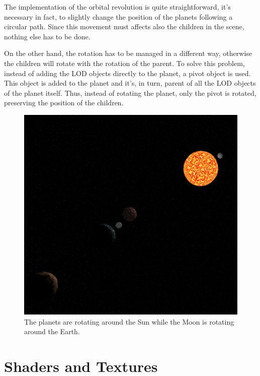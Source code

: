 \documentclass[paper=a4, fontsize=11pt]{scrartcl} %
\numberwithin{equation}{section} %
\numberwithin{figure}{section} %
\numberwithin{table}{section} %
\theoremstyle{definition}
\begin{document}
The implementation of the orbital revolution is quite straightforward, it's necessary
in fact, to slightly change the position of the planets following a
circular path. Since this movement must affects also the children in the scene,
nothing else has to be done.

On the other hand, the rotation has to be
managed in a different way, otherwise the children will rotate with the
rotation of the parent. To solve this problem, instead of adding the LOD objects
directly to the planet, a pivot object is used. This object is added to the
planet and it's, in turn, parent of all the LOD objects of the planet itself.
Thus, instead of
rotating the planet, only the pivot is rotated, preserving the position of
the children.

\begin{figure}
	\centering
	\includegraphics[scale=0.22]{images/solar_system.png}
	\caption{The planets are rotating around the Sun while the Moon is
		rotating around the Earth.}
	\label{fig:solar-system}
\end{figure}


\section{Shaders and Textures}
\end{document}
